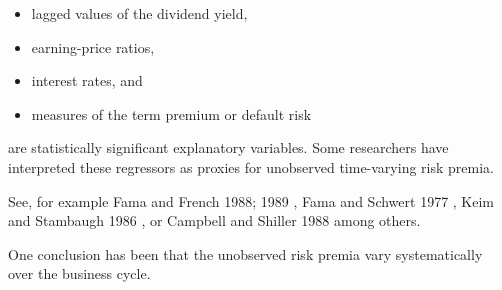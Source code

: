 \documentclass[]{book}
\providecommand{\tightlist}{%
  \setlength{\itemsep}{0pt}\setlength{\parskip}{0pt}}
\begin{document}
\begin{itemize}
\tightlist
\item
  lagged values of the dividend yield,
\item
  earning-price ratios,
\item
  interest rates, and
\item
  measures of the term premium or default risk
\end{itemize}

are statistically significant explanatory variables. Some researchers have interpreted these regressors as proxies for unobserved time-varying risk premia.

See, for example Fama and French 1988; 1989 , Fama and Schwert 1977 , Keim and Stambaugh 1986 , or Campbell and Shiller 1988 among others.

One conclusion has been that the unobserved risk premia vary systematically over the business cycle.

\citep{chauvet2000coincident}
\end{document}
